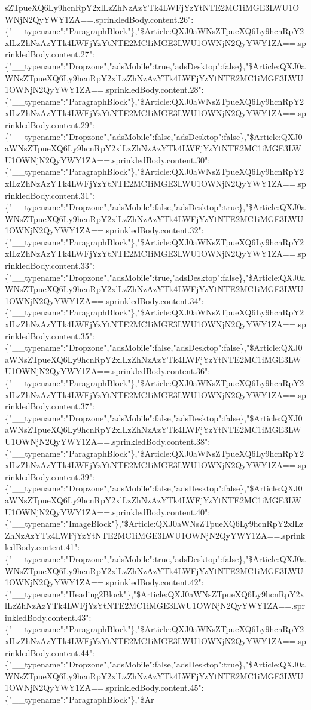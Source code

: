 sZTpueXQ6Ly9hcnRpY2xlLzZhNzAzYTk4LWFjYzYtNTE2MC1iMGE3LWU1OWNjN2QyYWY1ZA==.sprinkledBody.content.26":\{"\_\_typename":"ParagraphBlock"\},"\$Article:QXJ0aWNsZTpueXQ6Ly9hcnRpY2xlLzZhNzAzYTk4LWFjYzYtNTE2MC1iMGE3LWU1OWNjN2QyYWY1ZA==.sprinkledBody.content.27":\{"\_\_typename":"Dropzone","adsMobile":true,"adsDesktop":false\},"\$Article:QXJ0aWNsZTpueXQ6Ly9hcnRpY2xlLzZhNzAzYTk4LWFjYzYtNTE2MC1iMGE3LWU1OWNjN2QyYWY1ZA==.sprinkledBody.content.28":\{"\_\_typename":"ParagraphBlock"\},"\$Article:QXJ0aWNsZTpueXQ6Ly9hcnRpY2xlLzZhNzAzYTk4LWFjYzYtNTE2MC1iMGE3LWU1OWNjN2QyYWY1ZA==.sprinkledBody.content.29":\{"\_\_typename":"Dropzone","adsMobile":false,"adsDesktop":false\},"\$Article:QXJ0aWNsZTpueXQ6Ly9hcnRpY2xlLzZhNzAzYTk4LWFjYzYtNTE2MC1iMGE3LWU1OWNjN2QyYWY1ZA==.sprinkledBody.content.30":\{"\_\_typename":"ParagraphBlock"\},"\$Article:QXJ0aWNsZTpueXQ6Ly9hcnRpY2xlLzZhNzAzYTk4LWFjYzYtNTE2MC1iMGE3LWU1OWNjN2QyYWY1ZA==.sprinkledBody.content.31":\{"\_\_typename":"Dropzone","adsMobile":false,"adsDesktop":true\},"\$Article:QXJ0aWNsZTpueXQ6Ly9hcnRpY2xlLzZhNzAzYTk4LWFjYzYtNTE2MC1iMGE3LWU1OWNjN2QyYWY1ZA==.sprinkledBody.content.32":\{"\_\_typename":"ParagraphBlock"\},"\$Article:QXJ0aWNsZTpueXQ6Ly9hcnRpY2xlLzZhNzAzYTk4LWFjYzYtNTE2MC1iMGE3LWU1OWNjN2QyYWY1ZA==.sprinkledBody.content.33":\{"\_\_typename":"Dropzone","adsMobile":true,"adsDesktop":false\},"\$Article:QXJ0aWNsZTpueXQ6Ly9hcnRpY2xlLzZhNzAzYTk4LWFjYzYtNTE2MC1iMGE3LWU1OWNjN2QyYWY1ZA==.sprinkledBody.content.34":\{"\_\_typename":"ParagraphBlock"\},"\$Article:QXJ0aWNsZTpueXQ6Ly9hcnRpY2xlLzZhNzAzYTk4LWFjYzYtNTE2MC1iMGE3LWU1OWNjN2QyYWY1ZA==.sprinkledBody.content.35":\{"\_\_typename":"Dropzone","adsMobile":false,"adsDesktop":false\},"\$Article:QXJ0aWNsZTpueXQ6Ly9hcnRpY2xlLzZhNzAzYTk4LWFjYzYtNTE2MC1iMGE3LWU1OWNjN2QyYWY1ZA==.sprinkledBody.content.36":\{"\_\_typename":"ParagraphBlock"\},"\$Article:QXJ0aWNsZTpueXQ6Ly9hcnRpY2xlLzZhNzAzYTk4LWFjYzYtNTE2MC1iMGE3LWU1OWNjN2QyYWY1ZA==.sprinkledBody.content.37":\{"\_\_typename":"Dropzone","adsMobile":false,"adsDesktop":false\},"\$Article:QXJ0aWNsZTpueXQ6Ly9hcnRpY2xlLzZhNzAzYTk4LWFjYzYtNTE2MC1iMGE3LWU1OWNjN2QyYWY1ZA==.sprinkledBody.content.38":\{"\_\_typename":"ParagraphBlock"\},"\$Article:QXJ0aWNsZTpueXQ6Ly9hcnRpY2xlLzZhNzAzYTk4LWFjYzYtNTE2MC1iMGE3LWU1OWNjN2QyYWY1ZA==.sprinkledBody.content.39":\{"\_\_typename":"Dropzone","adsMobile":false,"adsDesktop":false\},"\$Article:QXJ0aWNsZTpueXQ6Ly9hcnRpY2xlLzZhNzAzYTk4LWFjYzYtNTE2MC1iMGE3LWU1OWNjN2QyYWY1ZA==.sprinkledBody.content.40":\{"\_\_typename":"ImageBlock"\},"\$Article:QXJ0aWNsZTpueXQ6Ly9hcnRpY2xlLzZhNzAzYTk4LWFjYzYtNTE2MC1iMGE3LWU1OWNjN2QyYWY1ZA==.sprinkledBody.content.41":\{"\_\_typename":"Dropzone","adsMobile":true,"adsDesktop":false\},"\$Article:QXJ0aWNsZTpueXQ6Ly9hcnRpY2xlLzZhNzAzYTk4LWFjYzYtNTE2MC1iMGE3LWU1OWNjN2QyYWY1ZA==.sprinkledBody.content.42":\{"\_\_typename":"Heading2Block"\},"\$Article:QXJ0aWNsZTpueXQ6Ly9hcnRpY2xlLzZhNzAzYTk4LWFjYzYtNTE2MC1iMGE3LWU1OWNjN2QyYWY1ZA==.sprinkledBody.content.43":\{"\_\_typename":"ParagraphBlock"\},"\$Article:QXJ0aWNsZTpueXQ6Ly9hcnRpY2xlLzZhNzAzYTk4LWFjYzYtNTE2MC1iMGE3LWU1OWNjN2QyYWY1ZA==.sprinkledBody.content.44":\{"\_\_typename":"Dropzone","adsMobile":false,"adsDesktop":true\},"\$Article:QXJ0aWNsZTpueXQ6Ly9hcnRpY2xlLzZhNzAzYTk4LWFjYzYtNTE2MC1iMGE3LWU1OWNjN2QyYWY1ZA==.sprinkledBody.content.45":\{"\_\_typename":"ParagraphBlock"\},"\$Ar